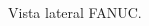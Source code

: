 \documentclass[a4paper,12pt]{article}
\begin{document}
\begin{figure}[H]
    \centering
    \begin{adjustbox}{scale = 0.65, max width=\columnwidth}
    \end{adjustbox}
    \caption{Vista lateral FANUC.}
    \label{teach fanuc alcance}
\end{figure}



\end{document}
